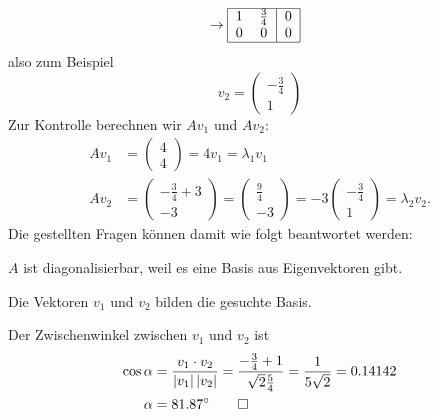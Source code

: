 \begin{loesung}
\begin{align*}
&\rightarrow
\begin{tabular}{|cc|c|}
\hline
1&$\frac34$&0\\
0&0&0\\
\hline
\end{tabular}
\end{align*}
also zum Beispiel
\[
v_2=\begin{pmatrix}-\frac34\\1\end{pmatrix}
\]
Zur Kontrolle berechnen wir $Av_1$ und $Av_2$:
\begin{align*}
Av_1&=\begin{pmatrix}4\\4\end{pmatrix}=4v_1=\lambda_1v_1\\
Av_2&=\begin{pmatrix}-\frac34+3\\-3\end{pmatrix}
=\begin{pmatrix}\frac94\\-3\end{pmatrix}
=-3\begin{pmatrix}-\frac34\\1\end{pmatrix}=\lambda_2v_2.
\end{align*}
Die gestellten Fragen können damit wie folgt beantwortet werden:
\begin{teilaufgaben}
\item $A$ ist diagonalisierbar, weil es eine Basis aus Eigenvektoren gibt.
\item Die Vektoren $v_1$ und $v_2$ bilden die gesuchte Basis.
\item Der Zwischenwinkel zwischen $v_1$ und $v_2$ ist
\begin{align*}
\cos\alpha&=\frac{v_1\cdot v_2}{|v_1|\,|v_2|}
=
\frac{-\frac34+1}{\sqrt{2}\frac54}=\frac{1}{5\sqrt{2}}=0.14142\\
\alpha&=81.87^\circ
\qedhere
\end{align*}
\end{teilaufgaben}
\end{loesung}

